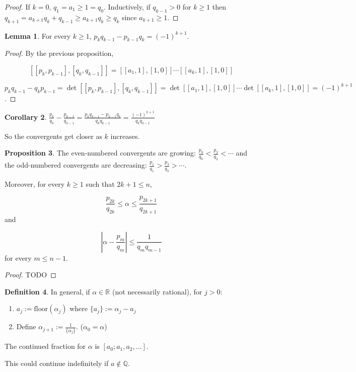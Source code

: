 \documentclass[12pt,a4paper]{article}
\theoremstyle{definition}
\newtheorem{definition}{Definition}[subsection]
\newtheorem{proposition}[definition]{Proposition}
\newtheorem{corollary}[definition]{Corollary}
\newtheorem{lemma}[definition]{Lemma}
\begin{document}
\begin{proof}
	If $k = 0$, $q_1 = a_1 \ge 1 = q_0$. Inductively, if $q_{k - 1} > 0$ for $k \ge 1$ then $q_{k + 1} = a_{k + 1} q_k + q_{k - 1} \ge a_{k + 1} q_k \ge q_k$ since $a_{k + 1} \ge 1$.
\end{proof}

\begin{lemma}
	For every $k \ge 1$, $p_k q_{k - 1} - p_{k - 1} q_k = {(-1)}^{k + 1}$.
\end{lemma}

\begin{proof}
	By the previous proposition,
	
	\[ [[p_k, p_{k - 1}], [q_k, q_{k - 1}]] = [[a_1, 1], [1, 0]] \cdots [[a_k, 1], [1, 0]] \]
	
	$p_k q_{k - 1} - q_k p_{k - 1} = \det [[p_k, p_{k - 1}], [q_k, q_{k - 1}]] = \det [[a_1, 1], [1, 0]] \cdots \det [[a_k, 1], [1, 0]] = {(-1)}^{k + 1}$.
\end{proof}

\begin{corollary}
	$\frac{p_k}{q_k} - \frac{p_{k - 1}}{q_{k - 1}} = \frac{p_k q_{k - 1} - p_{k - 1} q_k}{q_k q_{k - 1}} = \frac{{(-1)}^{k + 1}}{q_k q_{k - 1}}$

	So the convergents get closer as $k$ increases.
\end{corollary}

\begin{proposition}
	The even-numbered convergents are growing: $\frac{p_0}{q_0} < \frac{p_2}{q_2} < \cdots$ and the odd-numbered convergents are decreasing: $\frac{p_1}{q_1} > \frac{p_3}{q_3} > \cdots$.

	Moreover, for every $k \ge 1$ such that $2k + 1 \le n$,
	
	\[ \frac{p_{2k}}{q_{2k}} \le \alpha \le \frac{p_{2k + 1}}{q_{2k + 1}} \]
	and

	\[ \left| \alpha - \frac{p_m}{q_m} \right| \le \frac{1}{q_m q_{m - 1}} \]
	for every $m \le n - 1$.
\end{proposition}

\begin{proof}
	TODO
\end{proof}

\begin{definition}
	In general, if $\alpha \in \mathbb{R}$ (not necessarily rational), for $j > 0$:
	\begin{enumerate}
		\item $a_j := \text{floor}(\alpha_j)$ where $ \{ a_j \} := \alpha_j - a_j$
		\item Define $\alpha_{j + 1} := \frac{1}{\{\alpha_j\}}$. ($\alpha_0 = \alpha$)
	\end{enumerate}

	The continued fraction for $\alpha$ is $[a_0; a_1, a_2, \ldots]$.

	This could continue indefinitely if $a \notin \mathbb{Q}$.
\end{definition}
\end{document}
